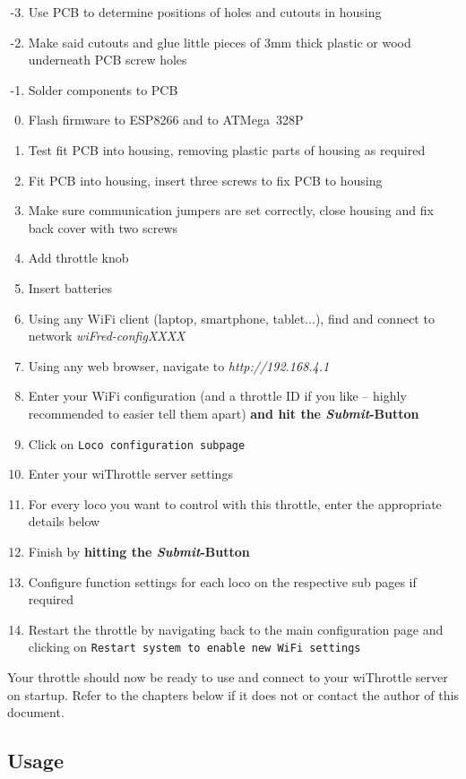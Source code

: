 \documentclass[11pt,a4paper]{scrartcl}
\begin{document}
\begin{enumerate}
\setcounter{enumi}{-4}
\item Use PCB to determine positions of holes and cutouts in housing
\item Make said cutouts and glue little pieces of 3mm thick plastic or wood underneath PCB screw holes  
\item Solder components to PCB
\item Flash firmware to ESP8266 and to ATMega~328P
\item Test fit PCB into housing, removing plastic parts of housing as required
\item Fit PCB into housing, insert three screws to fix PCB to housing
\item Make sure communication jumpers are set correctly, close housing and fix back cover with two screws
\item Add throttle knob
\item Insert batteries
\item Using any WiFi client (laptop, smartphone, tablet...), find and connect to network \textit{wiFred-configXXXX}
\item Using any web browser, navigate to \textit{http://192.168.4.1}
\item Enter your WiFi configuration (and a throttle ID if you like -- highly recommended to easier tell them apart) \textbf{and hit the \textit{Submit}-Button}
\item Click on \texttt{Loco configuration subpage}
\item Enter your wiThrottle server settings
\item For every loco you want to control with this throttle, enter the appropriate details below
\item Finish by \textbf{hitting the \textit{Submit}-Button}
\item Configure function settings for each loco on the respective sub pages if required
\item Restart the throttle by navigating back to the main configuration page and clicking on \texttt{Restart system to enable new WiFi settings}
\end{enumerate}

Your throttle should now be ready to use and connect to your wiThrottle server on startup. Refer to the chapters below if it does not or contact the author of this document.

\subsection{Usage}
\end{document}

